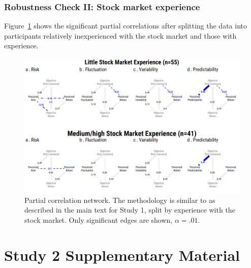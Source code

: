 \subsubsection{Robustness Check II: Stock market experience}
Figure~\ref{fig:study1_pcor_by_exp} shows the significant partial correlations after splitting the data into participants relatively inexperienced with the stock market and those with experience.
\begin{figure}[H] 
 \centering
 \includegraphics[width=.8\linewidth, keepaspectratio]{sfig2.png} 
 \caption{Partial correlation network. The methodology is similar to as described in the main text for Study 1, split by experience with the stock market. Only significant edges are shown, $\alpha=.01$.}
 \label{fig:study1_pcor_by_exp}
\end{figure}









\section{Study 2 Supplementary Material}
